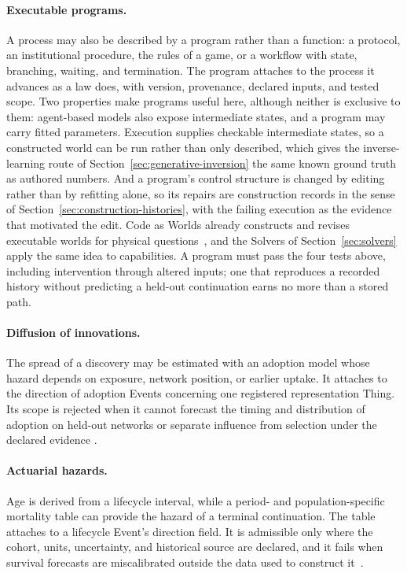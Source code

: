 \documentclass[10pt]{article}
\begin{document}
\paragraph{Executable programs.}
A process may also be described by a program rather than a function: a
protocol, an institutional procedure, the rules of a game, or a workflow with
state, branching, waiting, and termination. The program attaches to the process
it advances as a law does, with version, provenance, declared inputs, and tested
scope. Two properties make programs
useful here, although neither is exclusive to them: agent-based models also
expose intermediate states, and a program may carry fitted parameters.
Execution supplies checkable intermediate states, so a constructed world can be
run rather than only described, which gives the inverse-learning route of
Section~\ref{sec:generative-inversion} the same known ground truth as authored
numbers. And a program's control structure is changed by editing rather than by
refitting alone, so its repairs are construction records in the sense of
Section~\ref{sec:construction-histories}, with the failing execution as the
evidence that motivated the edit. Code as Worlds already constructs and revises
executable worlds for physical questions~\cite{wang2026codeAsWorlds}, and the
Solvers of Section~\ref{sec:solvers} apply the same idea to capabilities. A
program must pass the four tests above, including intervention through altered
inputs; one that reproduces a recorded history without predicting a held-out
continuation earns no more than a stored path.

\paragraph{Diffusion of innovations.}
The spread of a discovery may be estimated with an adoption model whose hazard
depends on exposure, network position, or earlier uptake. It attaches to the
direction of adoption Events concerning one registered representation Thing. Its scope is rejected when it cannot
forecast the timing and distribution of adoption on held-out networks or
separate influence from selection under the declared evidence
\cite{bass1969,aral2009,manski1993}.

\paragraph{Actuarial hazards.}
Age is derived from a lifecycle interval, while a period- and population-specific
mortality table can provide the hazard of a terminal continuation. The table
attaches to a lifecycle Event's direction field. It is
admissible only where the cohort, units, uncertainty, and historical source are
declared, and it fails when survival forecasts are miscalibrated outside the
data used to construct it~\cite{dicksonHardyWaters2020}.
\end{document}
